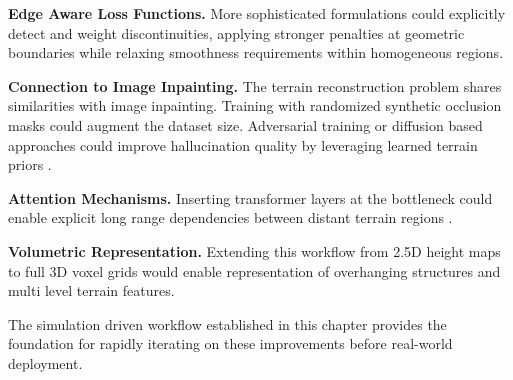 \textbf{Edge Aware Loss Functions.} More sophisticated formulations could explicitly detect and weight discontinuities, applying stronger penalties at geometric boundaries while relaxing smoothness requirements within homogeneous regions.

\textbf{Connection to Image Inpainting.} The terrain reconstruction problem shares similarities with image inpainting. Training with randomized synthetic occlusion masks could augment the dataset size. Adversarial training or diffusion based approaches could improve hallucination quality by leveraging learned terrain priors \cite{occludedelevation}.

\textbf{Attention Mechanisms.} Inserting transformer layers at the bottleneck could enable explicit long range dependencies between distant terrain regions \cite{neuralscene}.

\textbf{Volumetric Representation.} Extending this workflow from 2.5D height maps to full 3D voxel grids would enable representation of overhanging structures and multi level terrain features.

The simulation driven workflow established in this chapter provides the foundation for rapidly iterating on these improvements before real-world deployment.